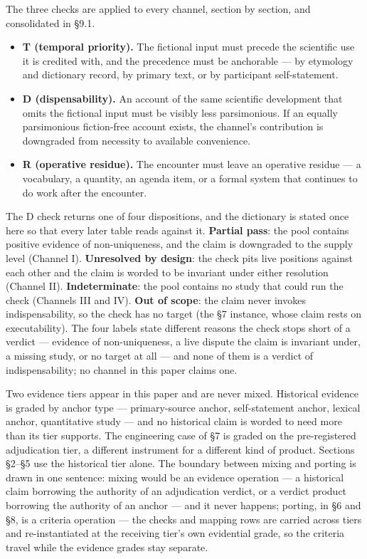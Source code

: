 \documentclass[11pt,a4paper]{article}
\begin{document}
The three checks are applied to every channel, section by section, and consolidated in §9.1.

\begin{itemize}[leftmargin=1.6em,itemsep=2pt,parsep=0pt,topsep=3pt]
\item \textbf{T (temporal priority).} The fictional input must precede the scientific use it is credited with, and the precedence must be anchorable — by etymology and dictionary record, by primary text, or by participant self-statement.
\item \textbf{D (dispensability).} An account of the same scientific development that omits the fictional input must be visibly less parsimonious. If an equally parsimonious fiction-free account exists, the channel's contribution is downgraded from necessity to available convenience.
\item \textbf{R (operative residue).} The encounter must leave an operative residue — a vocabulary, a quantity, an agenda item, or a formal system that continues to do work after the encounter.
\end{itemize}

The D check returns one of four dispositions, and the dictionary is stated once here so that every later table reads against it. \textbf{Partial pass}: the pool contains positive evidence of non-uniqueness, and the claim is downgraded to the supply level (Channel I). \textbf{Unresolved by design}: the check pits live positions against each other and the claim is worded to be invariant under either resolution (Channel II). \textbf{Indeterminate}: the pool contains no study that could run the check (Channels III and IV). \textbf{Out of scope}: the claim never invokes indispensability, so the check has no target (the §7 instance, whose claim rests on executability). The four labels state different reasons the check stops short of a verdict — evidence of non-uniqueness, a live dispute the claim is invariant under, a missing study, or no target at all — and none of them is a verdict of indispensability; no channel in this paper claims one.

Two evidence tiers appear in this paper and are never mixed. Historical evidence is graded by anchor type — primary-source anchor, self-statement anchor, lexical anchor, quantitative study — and no historical claim is worded to need more than its tier supports. The engineering case of §7 is graded on the pre-registered adjudication tier, a different instrument for a different kind of product. Sections §2–§5 use the historical tier alone. The boundary between mixing and porting is drawn in one sentence: mixing would be an evidence operation — a historical claim borrowing the authority of an adjudication verdict, or a verdict product borrowing the authority of an anchor — and it never happens; porting, in §6 and §8, is a criteria operation — the checks and mapping rows are carried across tiers and re-instantiated at the receiving tier's own evidential grade, so the criteria travel while the evidence grades stay separate.
\end{document}
